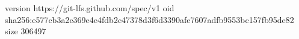 version https://git-lfs.github.com/spec/v1
oid sha256:e577cb3a2e369e4e4fdb2c47378d3f6d3390afe7607adfb9553bc157fb95de82
size 306497
